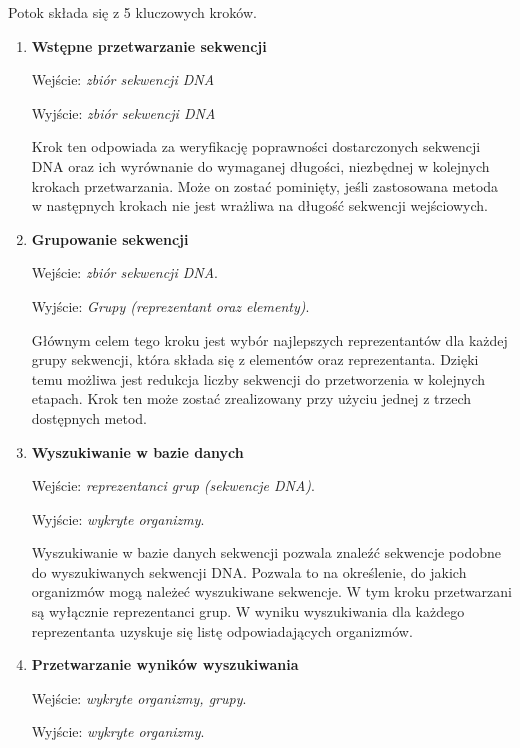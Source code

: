            Potok składa się z 5 kluczowych kroków.

            \begin{enumerate}
                \item {
                    \textbf{Wstępne przetwarzanie sekwencji}

                    Wejście: \textit{zbiór sekwencji DNA}

                    Wyjście: \textit{zbiór sekwencji DNA}

                    Krok ten odpowiada za weryfikację poprawności dostarczonych sekwencji DNA oraz ich wyrównanie do wymaganej długości, niezbędnej w kolejnych krokach przetwarzania. Może on zostać pominięty, jeśli zastosowana metoda w następnych krokach nie jest wrażliwa na długość sekwencji wejściowych.
                }
                \item {
                    \textbf{Grupowanie sekwencji}

                    Wejście: \textit{zbiór sekwencji DNA}.

                    Wyjście: \textit{Grupy (reprezentant oraz elementy)}.

                    Głównym celem tego kroku jest wybór najlepszych reprezentantów dla każdej grupy sekwencji, która składa się z elementów oraz reprezentanta. Dzięki temu możliwa jest redukcja liczby sekwencji do przetworzenia w kolejnych etapach. Krok ten może zostać zrealizowany przy użyciu jednej z trzech dostępnych metod.
                }
                \item {
                    \textbf{Wyszukiwanie w bazie danych}

                    Wejście: \textit{reprezentanci grup (sekwencje DNA)}.

                    Wyjście: \textit{wykryte organizmy}.

                    Wyszukiwanie w bazie danych sekwencji pozwala znaleźć sekwencje podobne do wyszukiwanych sekwencji DNA. Pozwala to na określenie, do jakich organizmów mogą należeć wyszukiwane sekwencje. W tym kroku przetwarzani są wyłącznie reprezentanci grup. W wyniku wyszukiwania dla każdego reprezentanta uzyskuje się listę odpowiadających organizmów.
                }
                \item {
                    \textbf{Przetwarzanie wyników wyszukiwania}

                    Wejście: \textit{wykryte organizmy, grupy}.

                    Wyjście: \textit{wykryte organizmy}.

}
\end{enumerate}
